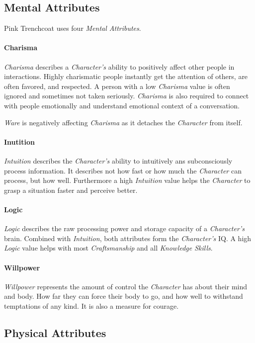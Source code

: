 \subsection{Mental Attributes}
Pink Trenchcoat uses four \emph{Mental Attributes}.
\paragraph{Charisma}
\emph{Charisma} describes a \emph{Character's} ability to positively affect other
people in interactions. Highly charismatic people instantly get the attention of
others, are often favored, and respected. A person with a low \emph{Charisma} value is
often ignored and sometimes not taken seriously.
\emph{Charisma} is also required to connect with people emotionally and understand
emotional context of a conversation.

\emph{Ware} is negatively affecting \emph{Charisma} as it detaches the \emph{Character}
from itself.

\paragraph{Inutition}
\emph{Intuition} describes the \emph{Character's} ability to intuitively ans
subconsciously process information. It describes not how fast or how much
the \emph{Character} can process, but how well. Furthermore a high \emph{Intuition}
value helps the \emph{Character} to grasp a situation faster and perceive better.

\paragraph{Logic}
\emph{Logic} describes the raw processing power and storage capacity of a
\emph{Character's} brain. Combined with \emph{Intuition}, both attributes form the
\emph{Character's} IQ. A high \emph{Logic} value helps with most \emph{Craftsmanship}
and all \emph{Knowledge Skills}.

\paragraph{Willpower}
\emph{Willpower} represents the amount of control the \emph{Character} has about
their mind and body. How far they can force their body to go, and how well to
withstand temptations of any kind. It is also a measure for courage.

\subsection{Physical Attributes}

